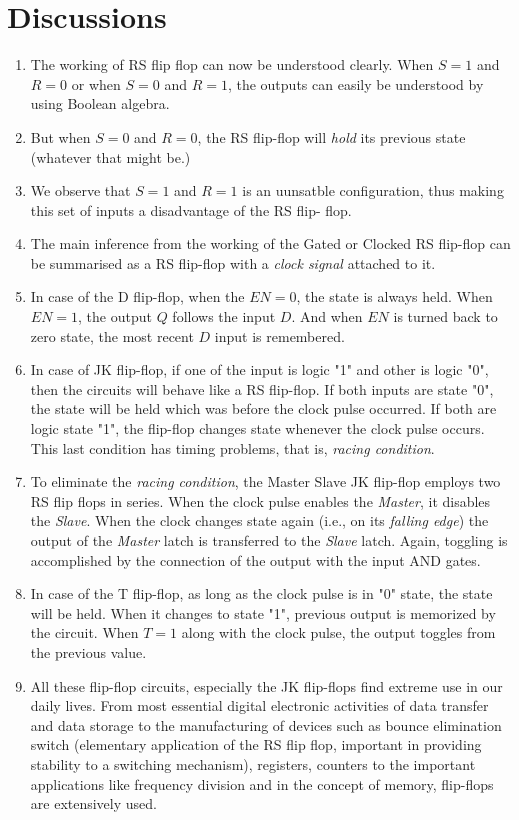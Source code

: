 \section{Discussions}
\begin{enumerate}
    \item The working of RS flip flop can now be understood clearly. When $S = 1$ and $R = 0$ or when $S = 0$ and $R = 1$, the outputs can easily be understood by using Boolean algebra.
    \item But when $S = 0$ and $R = 0$, the RS flip-flop will \emph{hold} its previous state (whatever that might be.)
    \item We observe that $S = 1$ and $R = 1$ is an uunsatble configuration, thus making this set of inputs a disadvantage of the RS flip- flop.
    \item The main inference from the working of the Gated or Clocked RS flip-flop can be summarised as a RS flip-flop with a \emph{clock signal} attached to it.
    \item In case of the D flip-flop, when the $EN = 0$, the state is always held. When $EN = 1$, the output $Q$ follows the input $D$. And when $EN$ is turned back to zero state, the most recent $D$ input is remembered.
    \item In case of JK flip-flop, if one of the input is logic "1" and other is logic "0", then the circuits will behave like a RS flip-flop. If both inputs are state "0", the state will be held which was before the clock pulse occurred. If both are logic state "1", the flip-flop changes state whenever the clock pulse occurs. This last condition has timing problems, that is, \emph{racing condition}.
    \item To eliminate the \emph{racing condition}, the Master Slave JK flip-flop employs two RS flip flops in series. When the clock pulse enables the \emph{Master}, it disables the \emph{Slave}. When the clock changes state again (i.e., on its \emph{falling edge}) the output of the \emph{Master} latch is transferred to the \emph{Slave} latch. Again, toggling is accomplished by the connection of the output with the input AND gates.
    \item In case of the T flip-flop, as long as the clock pulse is in "0" state, the state will be held. When it changes to state "1", previous output is memorized by the circuit. When $T = 1$ along with the clock pulse, the output toggles from the previous value.
    \item All these flip-flop circuits, especially the JK flip-flops find extreme use in our daily lives. From most essential digital electronic activities of data transfer and data storage to the manufacturing of devices such as bounce elimination switch (elementary application of the RS flip flop, important in providing stability to a switching mechanism), registers, counters to the important applications like frequency division and in the concept of memory, flip-flops are extensively used.
\end{enumerate}
